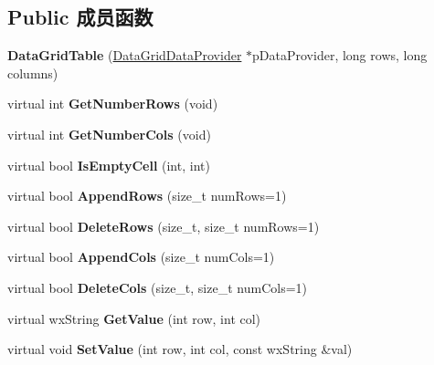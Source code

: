 \subsection*{Public 成员函数}
\begin{DoxyCompactItemize}
\item 
\hypertarget{class_data_grid_table_afebd34bcabfd0b1dda33758f4a641c81}{{\bfseries Data\+Grid\+Table} (\hyperlink{class_data_grid_data_provider}{Data\+Grid\+Data\+Provider} $\ast$p\+Data\+Provider, long rows, long columns)}\label{class_data_grid_table_afebd34bcabfd0b1dda33758f4a641c81}

\item 
\hypertarget{class_data_grid_table_a695ee078d56bb4a10e45909e1b8eb35f}{virtual int {\bfseries Get\+Number\+Rows} (void)}\label{class_data_grid_table_a695ee078d56bb4a10e45909e1b8eb35f}

\item 
\hypertarget{class_data_grid_table_aa415e75877c379e923981ed5d55baab0}{virtual int {\bfseries Get\+Number\+Cols} (void)}\label{class_data_grid_table_aa415e75877c379e923981ed5d55baab0}

\item 
\hypertarget{class_data_grid_table_a67807fa4bec5fc8c94de508af54c7887}{virtual bool {\bfseries Is\+Empty\+Cell} (int, int)}\label{class_data_grid_table_a67807fa4bec5fc8c94de508af54c7887}

\item 
\hypertarget{class_data_grid_table_aec0df3e67ef288cd210198d52e81ccc2}{virtual bool {\bfseries Append\+Rows} (size\+\_\+t num\+Rows=1)}\label{class_data_grid_table_aec0df3e67ef288cd210198d52e81ccc2}

\item 
\hypertarget{class_data_grid_table_aad12f10a9e362f5346bc62d9ccab851b}{virtual bool {\bfseries Delete\+Rows} (size\+\_\+t, size\+\_\+t num\+Rows=1)}\label{class_data_grid_table_aad12f10a9e362f5346bc62d9ccab851b}

\item 
\hypertarget{class_data_grid_table_aefa41f3db0525902180cb6e5a284e8a6}{virtual bool {\bfseries Append\+Cols} (size\+\_\+t num\+Cols=1)}\label{class_data_grid_table_aefa41f3db0525902180cb6e5a284e8a6}

\item 
\hypertarget{class_data_grid_table_aadcf407d150ac6de9ab5fbe89549aa25}{virtual bool {\bfseries Delete\+Cols} (size\+\_\+t, size\+\_\+t num\+Cols=1)}\label{class_data_grid_table_aadcf407d150ac6de9ab5fbe89549aa25}

\item 
\hypertarget{class_data_grid_table_a84151b7134dd32bec4df8835b2512a8e}{virtual wx\+String {\bfseries Get\+Value} (int row, int col)}\label{class_data_grid_table_a84151b7134dd32bec4df8835b2512a8e}

\item 
\hypertarget{class_data_grid_table_a0aa3d1a6c1df08615bfcf28f04a8307f}{virtual void {\bfseries Set\+Value} (int row, int col, const wx\+String \&val)}\label{class_data_grid_table_a0aa3d1a6c1df08615bfcf28f04a8307f}

\end{DoxyCompactItemize}
